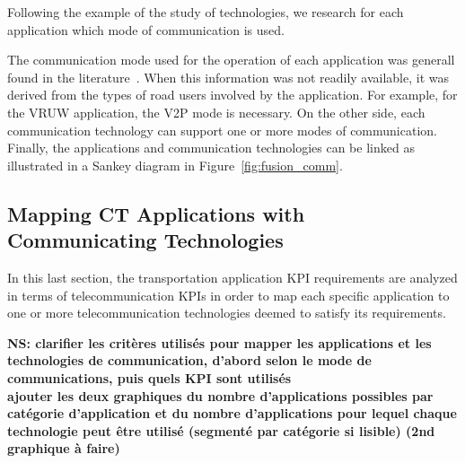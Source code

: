 Following the example of the study of technologies, we research for each application which mode of communication is used.

The communication mode used for the operation of each application was generall found in the literature~\cite{hobert_enhancements_2015}. When this information was not readily available, it was derived from the types of road users involved by the application. 
For example, for the \acrfull{VRUW} application, the \acrshort{V2P} mode is necessary. %
On the other side, each communication technology can support one or more modes of communication. Finally, the applications and communication technologies can be linked as illustrated in a Sankey diagram in Figure~\ref{fig:fusion_comm}. 


\subsection{Mapping CT Applications with Communicating Technologies}
In this last section, the transportation application \acrshort{KPI} requirements are analyzed in terms of telecommunication \acrshort{KPI}s in order to map each specific application to one or more telecommunication technologies deemed to satisfy its requirements.


{\bf NS: clarifier les critères utilisés pour mapper les applications et les technologies de communication, d'abord selon le mode de communications, puis quels KPI sont utilisés\\
ajouter les deux graphiques du nombre d'applications possibles par catégorie d'application et du nombre d'applications pour lequel chaque technologie peut être utilisé (segmenté par catégorie si lisible)  (2nd graphique à faire)}

